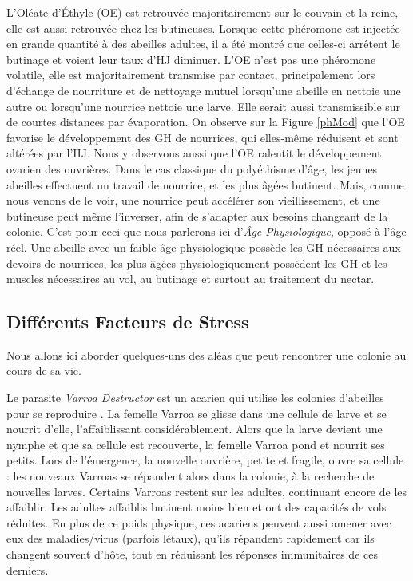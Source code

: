 			 L'Oléate d'Éthyle (OE) est retrouvée majoritairement sur le couvain et la reine, elle est aussi retrouvée chez les butineuses. Lorsque cette phéromone est injectée en grande quantité à des abeilles adultes, il a été montré que celles-ci arrêtent le butinage et voient leur taux d'HJ diminuer. L'OE n'est pas une phéromone volatile, elle est majoritairement transmise par contact, principalement lors d'échange de nourriture et de nettoyage mutuel lorsqu'une abeille en nettoie une autre ou lorsqu'une nourrice nettoie une larve. Elle serait aussi transmissible sur de courtes distances par évaporation. On observe sur la Figure \ref{phMod} que l'OE favorise le développement des GH de nourrices, qui elles-même réduisent et sont altérées par l'HJ. Nous y observons aussi que l'OE ralentit le développement ovarien des ouvrières. Dans le cas classique du polyéthisme d'âge, les jeunes abeilles effectuent un travail de nourrice, et les plus âgées butinent. Mais, comme nous venons de le voir, une nourrice peut accélérer son vieillissement, et une butineuse peut même l'inverser, afin de s'adapter aux besoins changeant de la colonie. C'est pour ceci que nous parlerons ici d'\textit{Âge Physiologique}, opposé à l'âge réel. Une abeille avec un faible âge physiologique possède les GH nécessaires aux devoirs de nourrices, les plus âgées physiologiquement possèdent les GH et les muscles nécessaires au vol, au butinage et surtout au traitement du nectar.
			
		\subsection{Différents Facteurs de Stress}
		Nous allons ici aborder quelques-uns des aléas que peut rencontrer une colonie au cours de sa vie.
		
		Le parasite \textit{Varroa Destructor} est un acarien qui utilise les colonies d'abeilles pour se reproduire \cite{le_conte_varroa_2010}. La femelle Varroa se glisse dans une cellule de larve et se nourrit d'elle, l'affaiblissant considérablement. Alors que la larve devient une nymphe et que sa cellule est recouverte, la femelle Varroa pond et nourrit ses petits. Lors de l'émergence, la nouvelle ouvrière, petite et fragile, ouvre sa cellule : les nouveaux Varroas se répandent alors dans la colonie, à la recherche de nouvelles larves. Certains Varroas restent sur les adultes, continuant encore de les affaiblir. Les adultes affaiblis butinent moins bien et ont des capacités de vols réduites. En plus de ce poids physique, ces acariens peuvent aussi amener avec eux des maladies/virus (parfois létaux), qu'ils répandent rapidement car ils changent souvent d'hôte, tout en réduisant les réponses immunitaires de ces derniers.
		
